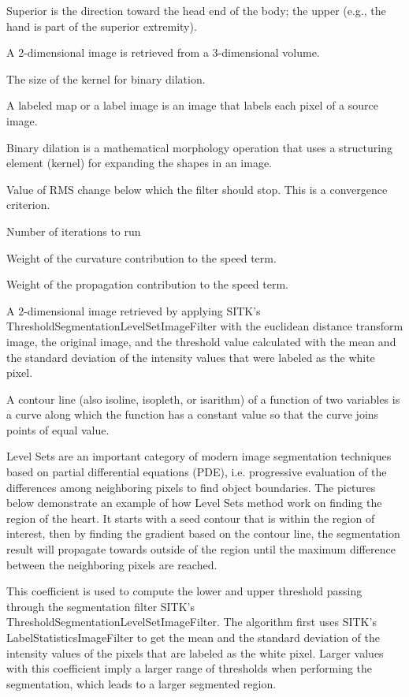 \begin{description}[font=\rmfamily\bfseries, leftmargin=3cm, style=nextline]
	\item[Superior] Superior is the direction toward the head end of the body; the upper (e.g., the hand is part of the superior extremity).
	\item[Slice] A 2-dimensional image is retrieved from a 3-dimensional volume.
	\item[Kernel Size] The size of the kernel for binary dilation.
	\item[Label Map] A labeled map or a label image is an image that labels each pixel of a source image. 
	\item[Binary Dilation] Binary dilation is a mathematical morphology operation that uses a structuring element (kernel) for expanding the shapes in an image.
	\item[rms\_error] Value of RMS change below which the filter should stop. This is a convergence criterion.
	\item[Maximum iteration] Number of iterations to run
	\item[Curvature scaling] Weight of the curvature contribution to the speed term.
	\item[Propagation scaling] Weight of the propagation contribution to the speed term.
	\item[Segmented slice] A 2-dimensional image retrieved by applying SITK's ThresholdSegmentationLevelSetImageFilter with the euclidean distance transform image, the original image, and the threshold value calculated with the mean and the standard deviation of the intensity values that were labeled as the white pixel.
	\item[Contour Line] A contour line (also isoline, isopleth, or isarithm) of a function of two variables is a curve along which the function has a constant value so that the curve joins points of equal value.
	\item[Level Sets] Level Sets are an important category of modern image segmentation techniques based on partial differential equations (PDE), i.e. progressive evaluation of the differences among neighboring pixels to find object boundaries. The pictures below demonstrate an example of how Level Sets method work on finding the region of the heart. It starts with a seed contour that is within the region of interest, then by finding the gradient based on the contour line, the segmentation result will propagate towards outside of the region until the maximum difference between the neighboring pixels are reached.
	\item[Threshold Coefficient] This coefficient is used to compute the lower and upper threshold passing through the segmentation filter SITK's ThresholdSegmentationLevelSetImageFilter. The algorithm first uses SITK's LabelStatisticsImageFilter to get the mean and the standard deviation of the intensity values of the pixels that are labeled as the white pixel. Larger values with this coefficient imply a larger range of thresholds when performing the segmentation, which leads to a larger segmented region.

\end{description}
